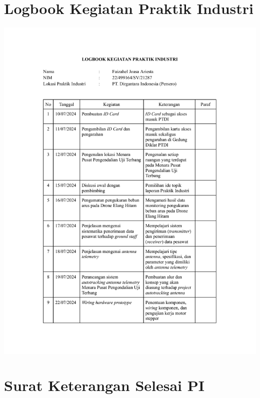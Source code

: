 \section{Logbook Kegiatan Praktik Industri}
\includegraphics[scale=0.7]{dokumen/logbook.pdf}

\newpage
\section{Surat Keterangan Selesai PI}


\newpage
